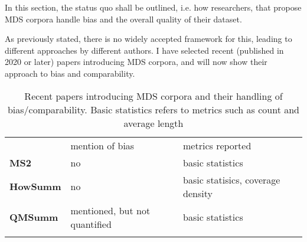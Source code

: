 \documentclass[../main.tex]{subfiles}
\begin{document}
In this section, the status quo shall be outlined, i.e. how researchers, that propose MDS corpora handle bias and the overall quality of their dataset.

As previously stated, there is no widely accepted framework for this, leading to different approaches by different authors.
I have selected recent (published in 2020 or later) papers introducing MDS corpora, and will now show their approach to bias and comparability.

\begin{table}
    \centering
    \begin{tabular}{l|lll}
                                                                                 & mention of bias               & metrics reported                   & \\
        \cline{1-3}
        \textbf{MS2}\cite{MS2-https://doi.org/10.48550/arxiv.2104.06486}         & no                            & basic statistics                   & \\
        \textbf{HowSumm}\cite{wikihow-https://doi.org/10.48550/arxiv.2110.03179} & no                            & basic statisics, coverage  density & \\
        \textbf{QMSumm}\cite{qmsum-https://doi.org/10.48550/arxiv.2104.05938}    & mentioned, but not quantified & basic statistics                   & \\
        \multicolumn{1}{l}{}                                                     &                               &                                    &
    \end{tabular}

    \caption{Recent papers introducing MDS corpora and their handling of bias/comparability. Basic statistics refers to metrics such as count and average length}
    \label{tab:status-quo}
\end{table}




\end{document}
